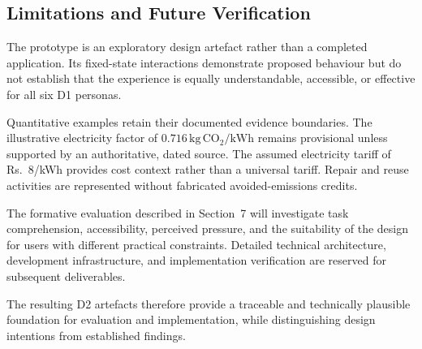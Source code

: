\documentclass[12pt,a4paper]{article}
\begin{document}
\subsection{Limitations and Future Verification}

The prototype is an exploratory design artefact rather than a completed application. Its fixed-state interactions demonstrate proposed behaviour but do not establish that the experience is equally understandable, accessible, or effective for all six D1 personas.

Quantitative examples retain their documented evidence boundaries. The illustrative electricity factor of $0.716\,\mathrm{kg\,CO_2/kWh}$ remains provisional unless supported by an authoritative, dated source. The assumed electricity tariff of Rs.~8/kWh provides cost context rather than a universal tariff. Repair and reuse activities are represented without fabricated avoided-emissions credits.

The formative evaluation described in Section~7 will investigate task comprehension, accessibility, perceived pressure, and the suitability of the design for users with different practical constraints. Detailed technical architecture, development infrastructure, and implementation verification are reserved for subsequent deliverables.

The resulting D2 artefacts therefore provide a traceable and technically plausible foundation for evaluation and implementation, while distinguishing design intentions from established findings.
\end{document}
